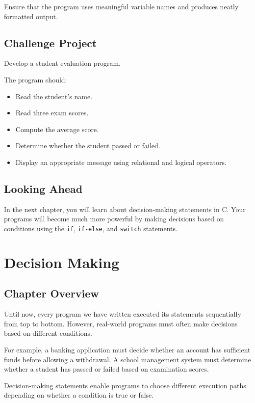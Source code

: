 \documentclass[12pt,openany]{book}
\begin{document}
Ensure that the program uses meaningful variable names and produces neatly formatted output.

\section{Challenge Project}

Develop a student evaluation program.

The program should:

\begin{itemize}
    \item Read the student's name.
    \item Read three exam scores.
    \item Compute the average score.
    \item Determine whether the student passed or failed.
    \item Display an appropriate message using relational and logical operators.
\end{itemize}

\section{Looking Ahead}

In the next chapter, you will learn about decision-making statements in C. Your programs will become much more powerful by making decisions based on conditions using the \texttt{if}, \texttt{if-else}, and \texttt{switch} statements.
\chapter{Decision Making}

\section{Chapter Overview}

Until now, every program we have written executed its statements sequentially from top to bottom. However, real-world programs must often make decisions based on different conditions.

For example, a banking application must decide whether an account has sufficient funds before allowing a withdrawal. A school management system must determine whether a student has passed or failed based on examination scores.

Decision-making statements enable programs to choose different execution paths depending on whether a condition is true or false.
\end{document}
